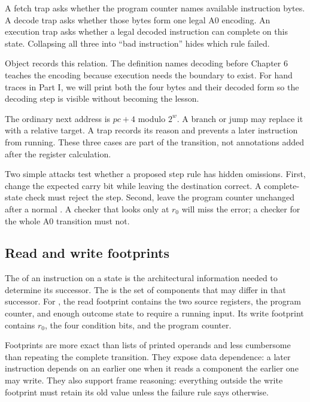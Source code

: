 \begin{warning}[title={Three failures, three debugging questions}]
A fetch trap asks whether the program counter names available instruction
bytes. A decode trap asks whether those bytes form one legal A0 encoding. An
execution trap asks whether a legal decoded instruction can complete on this
state. Collapsing all three into ``bad instruction'' hides which rule failed.
\end{warning}

Object  records this relation. The definition names decoding
before Chapter 6 teaches the encoding because execution needs the boundary to
exist. For hand traces in Part I, we will print both the four bytes and their
decoded form so the decoding step is visible without becoming the lesson.

The ordinary next address is \(pc+4\) modulo \(2^w\). A branch or jump may
replace it with a relative target. A trap records its reason and prevents a
later instruction from running. These three cases are part of the transition,
not annotations added after the register calculation.

Two simple attacks test whether a proposed step rule has hidden omissions.
First, change the expected carry bit while leaving the destination correct.
A complete-state check must reject the step. Second, leave the program counter
unchanged after a normal . A checker that looks only at \(r_0\) will
miss the error; a checker for the whole A0 transition must not.

\subsection{Read and write footprints}

The  of an instruction on a state is the architectural
information needed to determine its successor. The 
is the set of components that may differ in that successor. For
, the read footprint contains the two source registers,
the program counter, and enough outcome state to require a running input. Its
write footprint contains \(r_0\), the four condition bits, and the program
counter.

Footprints are more exact than lists of printed operands and less cumbersome
than repeating the complete transition. They expose data dependence: a later
instruction depends on an earlier one when it reads a component the earlier
one may write. They also support frame reasoning: everything outside the
write footprint must retain its old value unless the failure rule says
otherwise.

